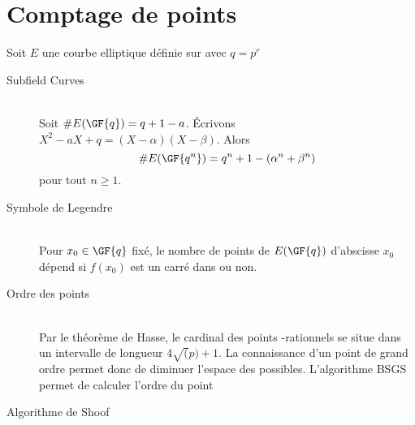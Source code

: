 \chapter{Comptage de points}
Soit $E$ une courbe elliptique définie sur  avec $q = p^r$

\begin{description}
    \item[Subfield Curves]\hfill \\
    Soit $\#E(\GF{q}) = q + 1 - a$. \'Ecrivons $X^2 -aX + q = (X - \alpha)(X - \beta)$. Alors
    $$\#E(\GF{q^n}) = q^n + 1 - (\alpha^n + \beta^n)$$
    pour tout $n \geq 1$.
    \item[Symbole de Legendre]\hfill \\
    Pour $x_0 \in \GF{q}$ fixé, le nombre de points de $E(\GF{q})$ d'abscisse $x_0$ dépend si $f(x_0)$ est un carré dans  ou non.
    \item[Ordre des points]\hfill \\
    Par le théorème de Hasse, le cardinal des points -rationnels se situe dans un intervalle de longueur $4\sqrt(p) + 1$. La connaissance d'un point de grand ordre permet donc de diminuer l'espace des possibles. L'algorithme BSGS permet de calculer l'ordre du point
    \item[Algorithme de Shoof]\hfill \\
\end{description}